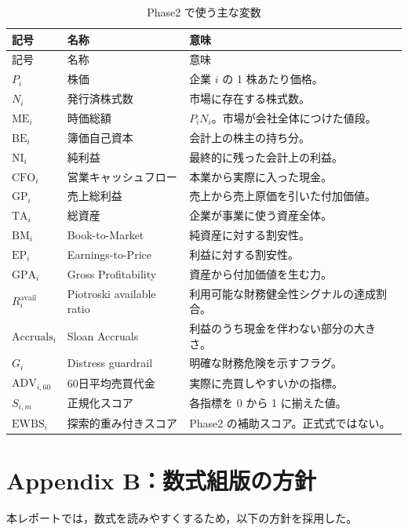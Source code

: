 \documentclass[a4paper,10pt]{article}
\newcommand{\ME}{\mathrm{ME}}
\newcommand{\BE}{\mathrm{BE}}
\newcommand{\NI}{\mathrm{NI}}
\newcommand{\CFO}{\mathrm{CFO}}
\newcommand{\GP}{\mathrm{GP}}
\newcommand{\TA}{\mathrm{TA}}
\newcommand{\ADV}{\mathrm{ADV}}
\newcommand{\BM}{\mathrm{BM}}
\newcommand{\EP}{\mathrm{EP}}
\newcommand{\GPA}{\mathrm{GPA}}
\newcommand{\Acc}{\mathrm{Accruals}}
\newcommand{\1}{\mathbf{1}}
\begin{document}
\begin{longtable}{p{22mm}p{40mm}p{78mm}}
\caption{Phase2 で使う主な変数}\label{tab:variables}\\
\toprule
記号 & 名称 & 意味 \\
\midrule
\endfirsthead
\toprule
記号 & 名称 & 意味 \\
\midrule
\endhead
$P_i$ & 株価 & 企業 $i$ の 1 株あたり価格。 \\
$N_i$ & 発行済株式数 & 市場に存在する株式数。 \\
$\ME_i$ & 時価総額 & $P_iN_i$。市場が会社全体につけた値段。 \\
$\BE_i$ & 簿価自己資本 & 会計上の株主の持ち分。 \\
$\NI_i$ & 純利益 & 最終的に残った会計上の利益。 \\
$\CFO_i$ & 営業キャッシュフロー & 本業から実際に入った現金。 \\
$\GP_i$ & 売上総利益 & 売上から売上原価を引いた付加価値。 \\
$\TA_i$ & 総資産 & 企業が事業に使う資産全体。 \\
$\BM_i$ & Book-to-Market & 純資産に対する割安性。 \\
$\EP_i$ & Earnings-to-Price & 利益に対する割安性。 \\
$\GPA_i$ & Gross Profitability & 資産から付加価値を生む力。 \\
$R_i^{\mathrm{avail}}$ & Piotroski available ratio & 利用可能な財務健全性シグナルの達成割合。 \\
$\Acc_i$ & Sloan Accruals & 利益のうち現金を伴わない部分の大きさ。 \\
$G_i$ & Distress guardrail & 明確な財務危険を示すフラグ。 \\
$\ADV_{i,60}$ & 60日平均売買代金 & 実際に売買しやすいかの指標。 \\
$S_{i,m}$ & 正規化スコア & 各指標を 0 から 1 に揃えた値。 \\
$\mathrm{EWBS}_i$ & 探索的重み付きスコア & Phase2 の補助スコア。正式式ではない。 \\
\bottomrule
\end{longtable}

\section{Appendix B：数式組版の方針}
本レポートでは，数式を読みやすくするため，以下の方針を採用した。
\end{document}
